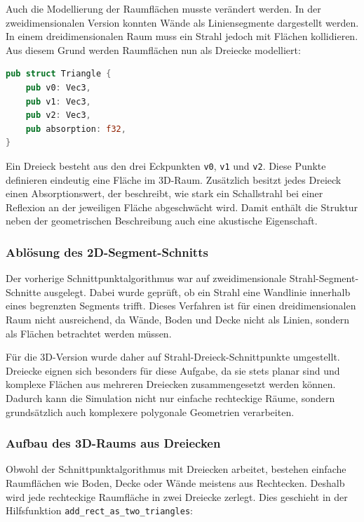 Auch die Modellierung der Raumflächen musste verändert werden. In der
zweidimensionalen Version konnten Wände als Liniensegmente dargestellt werden.
In einem dreidimensionalen Raum muss ein Strahl jedoch mit Flächen kollidieren.
Aus diesem Grund werden Raumflächen nun als Dreiecke modelliert:

\begin{lstlisting}[language=Rust]
pub struct Triangle {
    pub v0: Vec3,
    pub v1: Vec3,
    pub v2: Vec3,
    pub absorption: f32,
}
\end{lstlisting}

Ein Dreieck besteht aus den drei Eckpunkten \texttt{v0}, \texttt{v1} und
\texttt{v2}. Diese Punkte definieren eindeutig eine Fläche im
3D-Raum. Zusätzlich besitzt jedes Dreieck einen Absorptionswert, der beschreibt,
wie stark ein Schallstrahl bei einer Reflexion an der jeweiligen Fläche
abgeschwächt wird. Damit enthält die Struktur neben der geometrischen
Beschreibung auch eine akustische Eigenschaft.

\subsubsection{Ablösung des 2D-Segment-Schnitts}
\label{subsubsec:replace_2d_intersection}

Der vorherige Schnittpunktalgorithmus war auf zweidimensionale
Strahl-Segment-Schnitte ausgelegt. Dabei wurde geprüft, ob ein Strahl eine
Wandlinie innerhalb eines begrenzten Segments trifft. Dieses Verfahren ist für
einen dreidimensionalen Raum nicht ausreichend, da Wände, Boden und Decke nicht
als Linien, sondern als Flächen betrachtet werden müssen.

Für die 3D-Version wurde daher auf Strahl-Dreieck-Schnittpunkte umgestellt.
Dreiecke eignen sich besonders für diese Aufgabe, da sie stets planar sind und
komplexe Flächen aus mehreren Dreiecken zusammengesetzt werden können. Dadurch
kann die Simulation nicht nur einfache rechteckige Räume, sondern grundsätzlich
auch komplexere polygonale Geometrien verarbeiten.

\subsubsection{Aufbau des 3D-Raums aus Dreiecken}
\label{subsubsec:room_triangles}

Obwohl der Schnittpunktalgorithmus mit Dreiecken arbeitet, bestehen einfache
Raumflächen wie Boden, Decke oder Wände meistens aus Rechtecken. Deshalb wird
jede rechteckige Raumfläche in zwei Dreiecke zerlegt. Dies geschieht in der
Hilfsfunktion \texttt{add\_rect\_as\_two\_triangles}:

